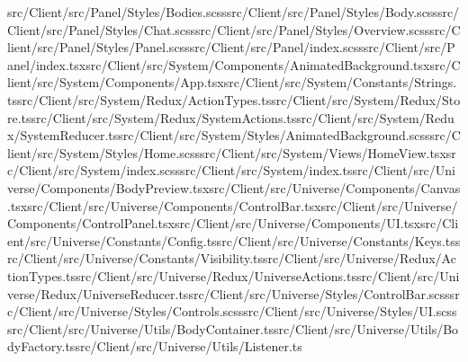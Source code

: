 \documentclass[a4paper,12pt]{article}
\begin{document}
src/Client/src/Panel/Styles/Bodies.scss\newline src/Client/src/Panel/Styles/Body.scss\newline src/Client/src/Panel/Styles/Chat.scss\newline src/Client/src/Panel/Styles/Overview.scss\newline src/Client/src/Panel/Styles/Panel.scss\newline src/Client/src/Panel/index.scss\newline src/Client/src/Panel/index.tsx\newline src/Client/src/System/Components/AnimatedBackground.tsx\newline src/Client/src/System/Components/App.tsx\newline src/Client/src/System/Constants/Strings.ts\newline src/Client/src/System/Redux/ActionTypes.ts\newline src/Client/src/System/Redux/Store.ts\newline src/Client/src/System/Redux/SystemActions.ts\newline src/Client/src/System/Redux/SystemReducer.ts\newline src/Client/src/System/Styles/AnimatedBackground.scss\newline src/Client/src/System/Styles/Home.scss\newline src/Client/src/System/Views/HomeView.tsx\newline src/Client/src/System/index.scss\newline src/Client/src/System/index.ts\newline src/Client/src/Universe/Components/BodyPreview.tsx\newline src/Client/src/Universe/Components/Canvas.tsx\newline src/Client/src/Universe/Components/ControlBar.tsx\newline src/Client/src/Universe/Components/ControlPanel.tsx\newline src/Client/src/Universe/Components/UI.tsx\newline src/Client/src/Universe/Constants/Config.ts\newline src/Client/src/Universe/Constants/Keys.ts\newline src/Client/src/Universe/Constants/Visibility.ts\newline src/Client/src/Universe/Redux/ActionTypes.ts\newline src/Client/src/Universe/Redux/UniverseActions.ts\newline src/Client/src/Universe/Redux/UniverseReducer.ts\newline src/Client/src/Universe/Styles/ControlBar.scss\newline src/Client/src/Universe/Styles/Controls.scss\newline src/Client/src/Universe/Styles/UI.scss\newline src/Client/src/Universe/Utils/BodyContainer.ts\newline src/Client/src/Universe/Utils/BodyFactory.ts\newline src/Client/src/Universe/Utils/Listener.ts\newline 
\end{document}
